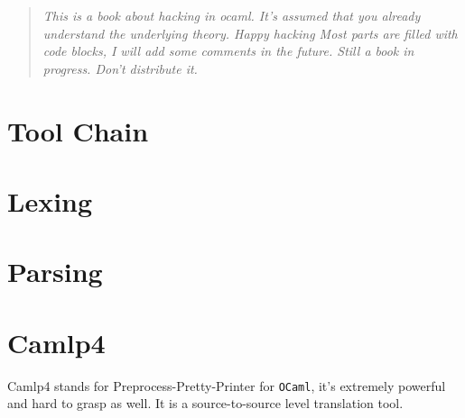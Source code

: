 \documentclass[svgnames,12pt,a4paper]{book}
\begin{document}

\setcounter{tocdepth}{4}




\begin{quotation}
  \textit{This is a book about hacking in ocaml.  It's assumed that
    you already understand the underlying theory. Happy hacking Most
    parts are filled with code blocks, I will add some comments in the
    future. Still a book in progress. Don't distribute it.}

\smiley
\end{quotation}



\newpage

\tableofcontents
\listoftodos
\vspace*{1cm}

\newpage
\newpage 
\chapter{Tool Chain}
 
















\chapter{Lexing}



\chapter{Parsing}
\label{sec:ocamlyacc}



\chapter{Camlp4}
\label{sec:camlp4}
Camlp4 stands for Preprocess-Pretty-Printer for \verb|OCaml|, it's
extremely powerful and  hard to grasp as well. It is a
source-to-source level translation tool.
  
  
  
  
  
  
  
  
  
  
  
\end{document}
